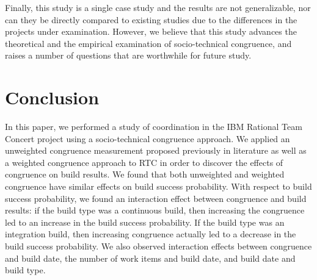 \documentclass[12pt,oneside]{book}
\begin{document}
Finally, this study is a single case study and the results are not generalizable, nor can they be directly compared to existing studies due to the differences in the projects under examination. However, we believe that this study advances the theoretical and the empirical examination of socio-technical congruence, and raises a number of questions that are worthwhile for future study.


\section{Conclusion}
\label{sec:conclusion}

In this paper, we performed a study of coordination in the IBM Rational Team Concert project using a
socio-technical congruence approach. We applied an unweighted congruence
measurement proposed previously in literature as well as a weighted congruence
approach to RTC in order to discover the effects of congruence on
build results. We found that both unweighted and weighted congruence have similar effects on build success probability. With respect to build success probability, we found an interaction effect between congruence
and build results: if the build type was a continuous build, then increasing the congruence led to an increase in the build success probability. If the build type was an integration build, then increasing congruence actually led to a decrease in the build success probability. We also observed interaction effects between congruence and build date, the number of work items and build date, and build date and build type.




\end{document}
